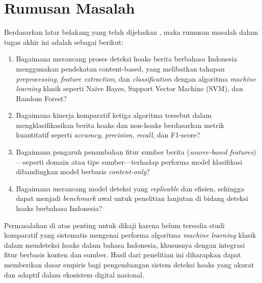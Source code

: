 \section{Rumusan Masalah}
Berdasarkan latar belakang yang telah dijelaskan , maka rumusan masalah dalam tugas akhir ini adalah sebagai berikut:
\begin{enumerate}
\item	Bagaimana merancang proses deteksi hoaks berita berbahasa Indonesia menggunakan pendekatan content-based, yang melibatkan tahapan \textit{preprocessing}, \textit{feature extraction}, dan \textit{classification} dengan algoritma \textit{machine learning} klasik seperti Naïve Bayes, Support Vector Machine (SVM), dan Random Forest?
\item	Bagaimana kinerja komparatif ketiga algoritma tersebut dalam mengklasifikasikan berita hoaks dan non-hoaks berdasarkan metrik kuantitatif seperti \textit{accuracy}, \textit{precision}, \textit{recall}, dan F1-score?
\item	Bagaimana pengaruh penambahan fitur sumber berita (\textit{source-based features})—seperti domain atau tipe sumber—terhadap performa model klasifikasi dibandingkan model berbasis \textit{content-only}?
\item	Bagaimana merancang model deteksi yang \textit{replicable} dan efisien, sehingga dapat menjadi \textit{benchmark} awal untuk penelitian lanjutan di bidang deteksi hoaks berbahasa Indonesia?
\end{enumerate}
\par Permasalahan di atas penting untuk dikaji karena belum tersedia studi komparatif yang sistematis mengenai performa algoritma \textit{machine learning} klasik dalam mendeteksi hoaks dalam bahasa Indonesia, khususnya dengan integrasi fitur berbasis konten dan sumber. Hasil dari penelitian ini diharapkan dapat memberikan dasar empiris bagi pengembangan sistem deteksi hoaks yang akurat dan adaptif dalam ekosistem digital nasional. 

